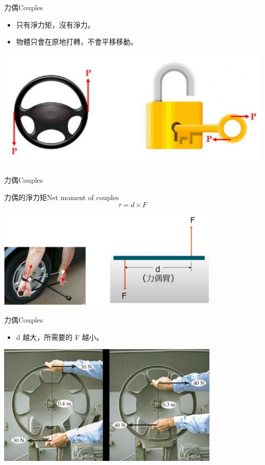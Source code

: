 \documentclass[beamer=true]{standalone}
\begin{document}
\begin{frame}{力偶Couples}
    \begin{itemize}
        \item 只有淨力矩，沒有淨力。
        \item 物體只會在原地打轉，不會平移移動。
    \end{itemize}\bigskip

    {\par\centering
        \includegraphics[width=.5\textwidth]{assets/88b4eb5e.png}
        \par}
\end{frame}
\begin{frame}{力偶Couples}
    \begin{alertblock}
        {力偶的淨力矩Net moment of couples}
        \begin{equation}
            \tau = d\times F
        \end{equation}
    \end{alertblock}

    {\par\centering
    \includegraphics[width=0.8\textwidth]{assets/9168cf9b.png}
    \par}
\end{frame}
\begin{frame}{力偶Couples}
    \begin{itemize}
        \item d 越大，所需要的 F 越小。
    \end{itemize}\bigskip
    {\par\centering
        \includegraphics[width=0.8\textwidth]{assets/347900c8.png}
        \par}
\end{frame}
\end{document}
